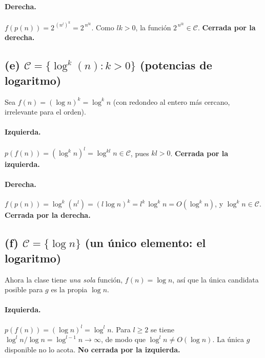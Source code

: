 \documentclass[11pt,a4paper]{article}
\theoremstyle{plain}
\theoremstyle{definition}
\begin{document}
\paragraph{Derecha.} $f(p(n)) = 2^{\,(n^{l})^{k}} = 2^{\,n^{lk}}$. Como $lk>0$, la
funci\'on $2^{\,n^{lk}}\in\mathcal{C}$. \textbf{Cerrada por la derecha.}

\medskip\noindent{}

\subsection*{(e) $\mathcal{C}=\{\log^{k}(n): k>0\}$ (potencias de logaritmo)}

Sea $f(n)=(\log n)^{k}=\log^{k} n$ (con redondeo al entero m\'as cercano, irrelevante
para el orden).

\paragraph{Izquierda.} $p(f(n)) = (\log^{k} n)^{l} = \log^{kl} n\in\mathcal{C}$, pues
$kl>0$. \textbf{Cerrada por la izquierda.}

\paragraph{Derecha.} $f(p(n)) = \log^{k}(n^{l}) = (l\log n)^{k} = l^{k}\,\log^{k} n
= O(\log^{k} n)$, y $\log^{k} n\in\mathcal{C}$. \textbf{Cerrada por la derecha.}

\medskip\noindent{}

\subsection*{(f) $\mathcal{C}=\{\log n\}$ (un \'unico elemento: el logaritmo)}

Ahora la clase tiene \emph{una sola} funci\'on, $f(n)=\log n$, as\'i que la \'unica
candidata posible para $g$ es la propia $\log n$.

\paragraph{Izquierda.} $p(f(n)) = (\log n)^{l} = \log^{l} n$. Para $l\geq 2$ se tiene
$\log^{l} n / \log n = \log^{l-1} n\to\infty$, de modo que $\log^{l} n\neq O(\log n)$.
La \'unica $g$ disponible no lo acota. \textbf{No cerrada por la izquierda.}
\end{document}
